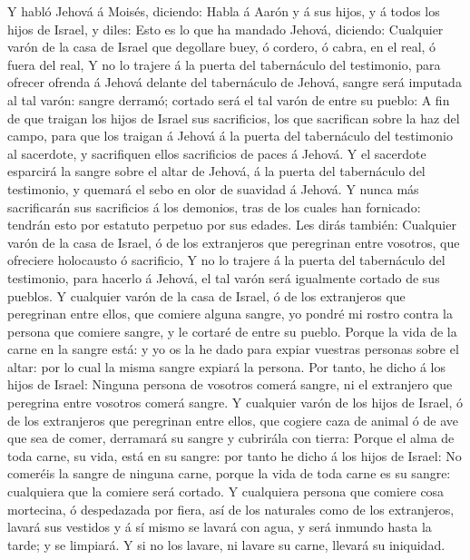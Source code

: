 Y habló Jehová á Moisés, diciendo:  Habla á
Aarón y á sus hijos, y á todos los hijos de Israel, y diles: Esto es lo
que ha mandado Jehová, diciendo:  Cualquier varón de la
casa de Israel que degollare buey, ó cordero, ó cabra, en el real, ó
fuera del real,  Y no lo trajere á la puerta del
tabernáculo del testimonio, para ofrecer ofrenda á Jehová delante del
tabernáculo de Jehová, sangre será imputada al tal varón: sangre
derramó; cortado será el tal varón de entre su pueblo:  A
fin de que traigan los hijos de Israel sus sacrificios, los que
sacrifican sobre la haz del campo, para que los traigan á Jehová á la
puerta del tabernáculo del testimonio al sacerdote, y sacrifiquen ellos
sacrificios de paces á Jehová.  Y el sacerdote esparcirá
la sangre sobre el altar de Jehová, á la puerta del tabernáculo del
testimonio, y quemará el sebo en olor de suavidad á Jehová.
 Y nunca más sacrificarán sus sacrificios á los demonios,
tras de los cuales han fornicado: tendrán esto por estatuto perpetuo por
sus edades.  Les dirás también: Cualquier varón de la casa
de Israel, ó de los extranjeros que peregrinan entre vosotros, que
ofreciere holocausto ó sacrificio,  Y no lo trajere á la
puerta del tabernáculo del testimonio, para hacerlo á Jehová, el tal
varón será igualmente cortado de sus pueblos.  Y
cualquier varón de la casa de Israel, ó de los extranjeros que
peregrinan entre ellos, que comiere alguna sangre, yo pondré mi rostro
contra la persona que comiere sangre, y le cortaré de entre su pueblo.
 Porque la vida de la carne en la sangre está: y yo os la
he dado para expiar vuestras personas sobre el altar: por lo cual la
misma sangre expiará la persona.  Por tanto, he dicho á
los hijos de Israel: Ninguna persona de vosotros comerá sangre, ni el
extranjero que peregrina entre vosotros comerá sangre.  Y
cualquier varón de los hijos de Israel, ó de los extranjeros que
peregrinan entre ellos, que cogiere caza de animal ó de ave que sea de
comer, derramará su sangre y cubrirála con tierra: 
Porque el alma de toda carne, su vida, está en su sangre: por tanto he
dicho á los hijos de Israel: No comeréis la sangre de ninguna carne,
porque la vida de toda carne es su sangre: cualquiera que la comiere
será cortado.  Y cualquiera persona que comiere cosa
mortecina, ó despedazada por fiera, así de los naturales como de los
extranjeros, lavará sus vestidos y á sí mismo se lavará con agua, y será
inmundo hasta la tarde; y se limpiará.  Y si no los
lavare, ni lavare su carne, llevará su iniquidad.

